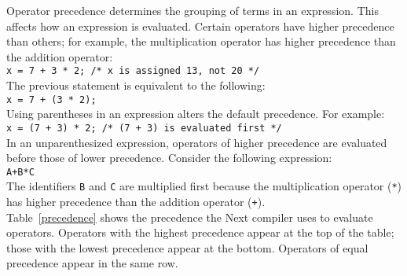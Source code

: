 \documentclass[12pt]{article}
\begin{document}
\noindent Operator precedence determines the grouping of terms in an expression.  This affects how an expression is evaluated.  Certain operators have higher precedence than others; for example, the multiplication operator has higher precedence than the addition operator: \\

\texttt{x = 7 + 3 * 2; \hspace{20 mm}  /* x is assigned 13, not 20 */} \\

\noindent The previous statement is equivalent to the following: \\

\texttt{x = 7 + (3 * 2);} \\

\noindent Using parentheses in an expression alters the default precedence.  For example: \\

\texttt{x = (7 + 3) * 2; \hspace{20 mm} /* (7 + 3) is evaluated first */} \\

\noindent In an unparenthesized expression, operators of higher precedence are evaluated before those of lower precedence.  Consider the following expression: \\

\texttt{A+B*C} \\

\noindent The identifiers \texttt{B} and \texttt{C} are multiplied first because the multiplication operator (\texttt{*}) has higher precedence than the addition operator (\texttt{+}). \\

\noindent Table~\ref{precedence} shows the precedence the Next compiler uses to evaluate operators.  Operators with the highest precedence appear at the top of the table; those with the lowest precedence appear at the bottom.  Operators of equal precedence appear in the same row. \\
\end{document}
